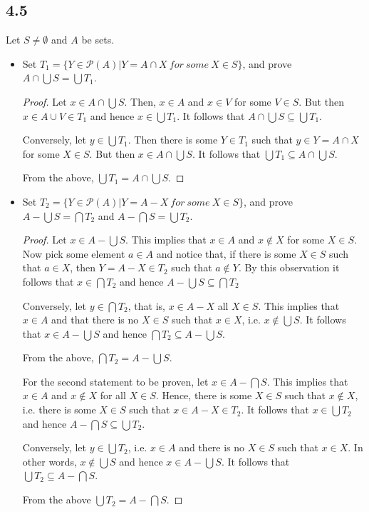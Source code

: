 \subsection*{4.5} Let $S \neq \emptyset$ and $A$ be sets.

\begin{itemize}
    \item Set $T_1 = \{Y \in \mathcal{P}(A) | Y = A \cap X~for~some~X\in S\}$, and prove $A \cap \bigcup S = \bigcup T_1$.
    
    \begin{proof}
    Let $x \in A \cap \bigcup S$. Then, $x \in A$ and $x \in V$ for some $V \in S$. But then $x \in A \cup V \in T_1$ and hence $x \in \bigcup T_1$. It follows that $A \cap \bigcup S \subseteq \bigcup T_1$.
    
    Conversely, let $y \in \bigcup T_1$. Then there is some $Y \in T_1$ such that $y \in Y = A \cap X$ for some $X \in S$. But then $x \in A \cap \bigcup S$. It follows that $\bigcup T_1 \subseteq A \cap \bigcup S$.
    
    From the above, $\bigcup T_1 = A \cap \bigcup S$.
    \end{proof}
    
    \item Set $T_2 = \{Y \in \mathcal{P}(A) | Y = A - X~for~some~X\in S\}$, and prove $A - \bigcup S = \bigcap T_2$ and $A - \bigcap S = \bigcup T_2$.
    
    \begin{proof}
    Let $x \in A - \bigcup S$. This implies that $x \in A$ and $x \notin X$ for some $X \in S$. Now pick some element $a \in A$ and notice that, if there is some $X \in S$ such that $a \in X$, then $Y = A - X \in T_2$ such that $a \notin Y$. By this observation it follows that $x \in \bigcap T_2$ and hence $A - \bigcup S \subseteq \bigcap T_2$
    
    Conversely, let $y \in \bigcap T_2$, that is, $x \in A - X$ all $X \in S$. This implies that $x \in A$ and that there is no $X \in S$ such that $x \in X$, i.e. $x \notin \bigcup S$. It follows that $x \in A - \bigcup S$ and hence $\bigcap T_2 \subseteq A - \bigcup S$.
    
    From the above, $\bigcap T_2 = A - \bigcup S$.
    
    \vspace{1em}
    
    For the second statement to be proven, let $x \in A - \bigcap S$. This implies that $x \in A$ and $x \notin X$ for all $X \in S$. Hence, there is some $X \in S$ such that $x \notin X$, i.e. there is some $X \in S$ such that $x \in A - X \in T_2$. It follows that $x \in \bigcup T_2$ and hence $A - \bigcap S \subseteq \bigcup T_2$.
    
    Conversely, let $y \in \bigcup T_2$, i.e. $x \in A$ and there is no $X \in S$ such that $x \in X$. In other words, $x \notin \bigcup S$ and hence $x \in A - \bigcup S$. It follows that $\bigcup T_2 \subseteq A - \bigcap S$.
    
    From the above $\bigcup T_2 = A - \bigcap S$.
    \end{proof}
\end{itemize}
